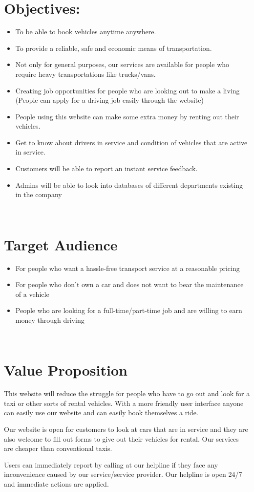 \documentclass[12pt,a4paper]{article}
\begin{document}
\section*{Objectives:}
\begin{itemize}
 \item To be able to book vehicles anytime anywhere.
 \item To provide a reliable, safe and economic means of transportation.
\item Not only for general purposes, our services are available for people who require heavy transportations like trucks/vans.
\item Creating job opportunities for people who are looking out to make a living (People can apply for a driving job easily through the website) 
\item People using this website can make some extra money by renting out their vehicles.
\item Get to know about drivers in service and condition of vehicles that are active in service.
\item Customers will be able to report an instant service feedback.
\item Admins will be able to look into databases of different departments existing in the company

\end{itemize}
\,
\newpage

\section*{Target Audience}
\begin{itemize}
\item For people who want a hassle-free transport service at a reasonable pricing
\item For people who don’t own a car and does not want to bear the maintenance of a vehicle 
\item People who are looking for a full-time/part-time job and are willing to earn money through driving
\end{itemize}
\,
\section*{Value Proposition}
\begin{flushleft}
This website will reduce the struggle for people who have to go out and look for a taxi or other sorts of rental vehicles. 
With a more friendly user interface anyone can easily use our website and can easily book themselves a ride.
\end{flushleft}
\begin{flushright}
Our website is open for customers to look at cars that are in service and they are also welcome to fill out forms to give out their vehicles for rental. 
Our services are cheaper than conventional taxis.
\end{flushright}
\begin{flushleft}
Users can immediately report by calling at our helpline if they face any inconvenience caused by our service/service provider. Our helpline is open 24/7 and immediate actions are applied.
\end{flushleft}
\,
\end{document}
